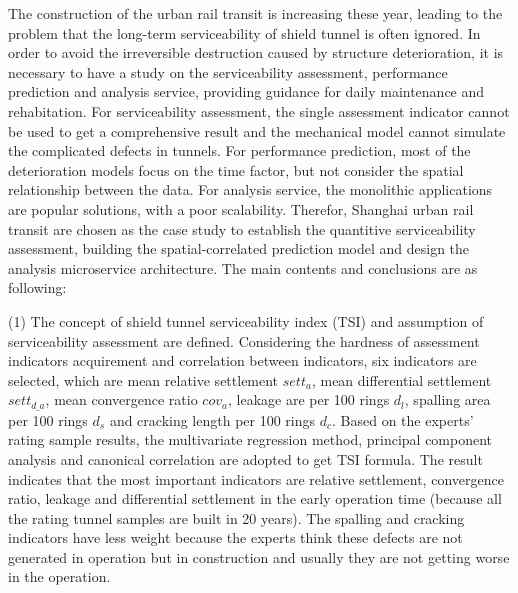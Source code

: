 \begin{eabstract}

The construction of the urban rail transit is increasing these year, leading to the problem that the long-term serviceability of shield tunnel is often ignored. In order to avoid the irreversible destruction caused by structure deterioration, it is necessary to have a study on the serviceability assessment, performance prediction and analysis service, providing guidance for daily maintenance and rehabitation. For serviceability assessment, the single assessment indicator cannot be used to get a comprehensive result and the mechanical model cannot simulate the complicated defects in tunnels. For performance prediction, most of the deterioration models focus on the time factor, but not consider the spatial relationship between the data. For analysis service, the monolithic applications are popular solutions, with a poor scalability. Therefor, Shanghai urban rail transit are chosen as the case study to establish the quantitive serviceability assessment, building the spatial-correlated prediction model and design the analysis microservice architecture. The main contents and conclusions are as following:

(1) The concept of shield tunnel serviceability index (TSI) and assumption of serviceability assessment are defined. Considering the hardness of assessment indicators acquirement and correlation between indicators, six indicators are selected, which are mean relative settlement $sett_{a}$, mean differential settlement $sett_{d\_a}$, mean convergence ratio $cov_a$, leakage are per 100 rings $d_l$, spalling area per 100 rings $d_s$ and cracking length per 100 rings $d_c$. Based on the experts' rating sample results, the multivariate regression method, principal component analysis and canonical correlation are adopted to get TSI formula. The result indicates that the most important indicators are relative settlement, convergence ratio, leakage and differential settlement in the early operation time (because all the rating tunnel samples are built in 20 years). The spalling and cracking indicators have less weight because the experts think these defects are not generated in operation but in construction and usually they are not getting worse in the operation. 


\end{eabstract}
